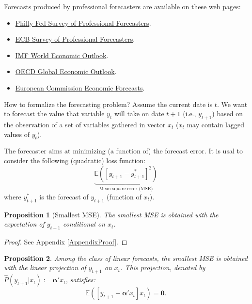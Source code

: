 \documentclass[
  11pt,
]{book}
\providecommand{\tightlist}{%
  \setlength{\itemsep}{0pt}\setlength{\parskip}{0pt}}
\newtheorem{proposition}{Proposition}[chapter]
\theoremstyle{definition}
\theoremstyle{definition}
\theoremstyle{definition}
\theoremstyle{definition}
\theoremstyle{remark}
\begin{document}
Forecasts produced by professional forecasters are available on these web pages:

\begin{itemize}
\tightlist
\item
  \href{https://www.philadelphiafed.org/research-and-data/real-time-center/survey-of-professional-forecasters/}{Philly Fed Survey of Professional Forecasters}.
\item
  \href{http://www.ecb.europa.eu/stats/prices/indic/forecast/html/index.en.html}{ECB Survey of Professional Forecasters}.
\item
  \href{https://www.imf.org/external/pubs/ft/weo/2016/update/01/}{IMF World Economic Outlook}.
\item
  \href{http://www.oecd.org/eco/economicoutlook.htm}{OECD Global Economic Outlook}.
\item
  \href{http://ec.europa.eu/economy_finance/eu/forecasts/index_en.htm}{European Commission Economic Forecasts}.
\end{itemize}

How to formalize the forecasting problem? Assume the current date is \(t\). We want to forecast the value that variable \(y_t\) will take on date \(t+1\) (i.e., \(y_{t+1}\)) based on the observation of a set of variables gathered in vector \(x_t\) (\(x_t\) may contain lagged values of \(y_t\)).

The forecaster aims at minimizing (a function of) the forecast error. It is usal to consider the following (quadratic) loss function:
\[
\underbrace{\mathbb{E}([y_{t+1} - y^*_{t+1}]^2)}_{\mbox{Mean square error (MSE)}}
\]
where \(y^*_{t+1}\) is the forecast of \(y_{t+1}\) (function of \(x_t\)).

\begin{proposition}[Smallest MSE]
\protect\hypertarget{prp:smallestMSE}{}\label{prp:smallestMSE}The smallest MSE is obtained with the expectation of \(y_{t+1}\) conditional on \(x_t\).
\end{proposition}

\begin{proof}
See Appendix \ref{AppendixProof}.
\end{proof}

\begin{proposition}
\protect\hypertarget{prp:smallestMSElinear}{}\label{prp:smallestMSElinear}Among the class of linear forecasts, the smallest MSE is obtained with the linear projection of \(y_{t+1}\) on \(x_t\).
This projection, denoted by \(\hat{P}(y_{t+1}|x_t):=\boldsymbol\alpha'x_t\), satisfies:
\begin{equation}
\mathbb{E}\left( [y_{t+1} - \boldsymbol\alpha'x_t]x_t \right)=\mathbf{0}.\label{eq:proj}
\end{equation}
\end{proposition}
\end{document}

